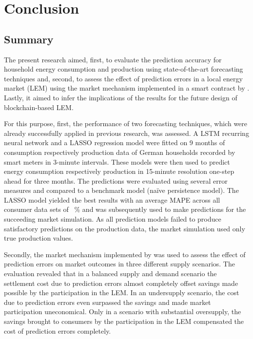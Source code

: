 
\section{Conclusion}\label{Sec:Conc}




\subsection{Summary}\label{Sec:Conclusion;Subsec:Summary}

The present research aimed, first, to evaluate the prediction accuracy for household energy consumption and production using state-of-the-art forecasting techniques and, second, to assess the effect of prediction errors in a local energy market (LEM) using the market mechanism implemented in a smart contract by \citet{Mengelkamp:2018a}. Lastly, it aimed to infer the implications of the results for the future design of blockchain-based LEM.

For this purpose, first, the performance of two forecasting techniques, which were already successfully applied in previous research, was assessed. A LSTM recurring neural network and a LASSO regression model were fitted on 9 months of consumption respectively production data of German households recorded by smart meters in 3-minute intervals. These models were then used to predict energy consumption respectively production in 15-minute resolution one-step ahead for three months. The predictions were evaluated using several error measures and compared to a benchmark model (na\"ive persistence model). The LASSO model yielded the best results with an average MAPE across all consumer data sets of ~\% and was subsequently used to make predictions for the succeeding market simulation. As all prediction models failed to produce satisfactory predictions on the production data, the market simulation used only true production values.

Secondly, the market mechanism implemented by \citet{Mengelkamp:2018a} was used to assess the effect of prediction errors on market outcomes in three different supply scenarios. The evaluation revealed that in a balanced supply and demand scenario the settlement cost due to prediction errors almost completely offset savings made possible by the participation in the LEM. In an undersupply scenario, the cost due to prediction errors even surpassed the savings and made market participation uneconomical. Only in a scenario with substantial oversupply, the savings brought to consumers by the participation in the LEM compensated the cost of prediction errors completely.

